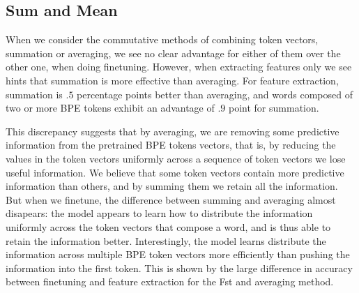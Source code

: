 \documentclass[11pt]{article}
\begin{document}
    \subsection{Sum and Mean}
                When we consider the commutative methods of combining
     token vectors, summation or averaging, we see no clear advantage
     for either of them over the other one, when doing
     finetuning. However, when extracting features only we see hints
     that summation is more effective than averaging. For feature
     extraction, summation is $.5$ percentage points better than
     averaging, and words composed of two or more BPE tokens exhibit
     an advantage of $.9$ point for summation.
    
                This discrepancy suggests that by averaging, we are
     removing some predictive information from the pretrained BPE
     tokens vectors, that is, by reducing the values in the token vectors
     uniformly across a sequence of token vectors we lose useful
     information.
        We believe that some token vectors contain more predictive
     information than others, and by summing them we retain all the
     information.
                     But when we finetune, the difference between
     summing and averaging almost disapears: the model appears to learn
     how to distribute the information uniformly across the token vectors
     that compose a word, and is thus able to retain the information
     better. Interestingly, the model learns distribute the
     information across multiple BPE token vectors more efficiently than
     pushing the information into the first token. This is shown by
     the large difference in accuracy between finetuning and feature extraction
     for the Fst and averaging method.
   
\end{document}
